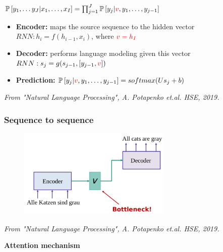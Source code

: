 \documentclass{tum-presentation}
\begin{document}
\begin{frame}
	\centering \huge $\mathbb{P}\left[ y_{1}, \dots y_{J} | x_1, \dots, x_I \right] = 
	\prod_{j=1}^{J} \mathbb{P}\left[ y_{j} |  \textcolor{red}{v}, y_1, \dots, y_{j-1}\right]$
	\begin{itemize}
		\item \textbf{\textcolor{TUMBlau}{Encoder:}} maps the source sequence to the hidden vector
		$RNN: h_i = f(h_{i-1}, x_i)$, where $\textcolor{red}{v=h_I}$
		\item \textbf{\textcolor{TUMBlau}{Decoder:}} performs language modeling given this vector
		$RNN: s_j=g(s_{j-1}, [y_{j-1}, \textcolor{red}{v}])$
		\item \textbf{\textcolor{TUMBlau}{Prediction:}}
		$\mathbb{P}\left[ y_{j} |  \textcolor{red}{v}, y_1, \dots, y_{j-1}\right] = softmax(Us_j + b)$
	\end{itemize}	
	\begin{flushright}
	\textit{	From "Natural Language Processing", A. Potapenko et.al. HSE, 2019. }
	\end{flushright}
\end{frame}
	
\begin{frame}
	\frametitle{Sequence to sequence}
	\begin{figure}
		\centering
		\includegraphics[width=0.65\textwidth,keepaspectratio=true]{tum-resources/images/seq2seq_5.png}
		\label{fig:seq2seq_5}
	\end{figure}
	\begin{flushright}
	\textit{	From "Natural Language Processing", A. Potapenko et.al. HSE, 2019. }
	\end{flushright}
\end{frame}

\begin{frame}[c]
	\centering
	\begin{center}
		\Huge\textbf{Attention mechanism}
	\end{center}
\end{frame}
\end{document}
